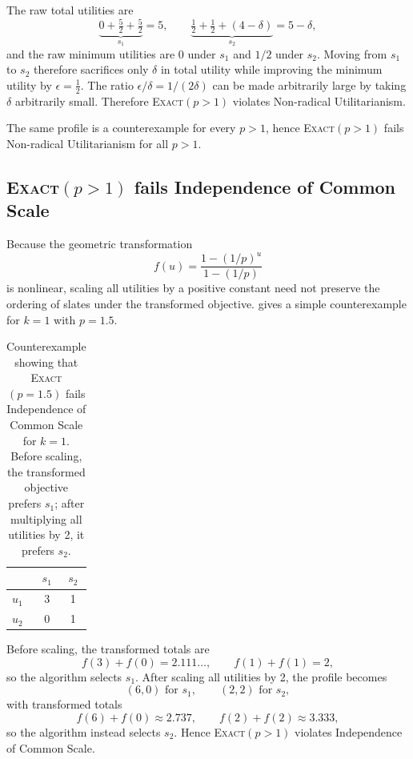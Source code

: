 \documentclass[11pt]{article}
\newcommand{\ExactP}{\textsc{Exact}$(p>1)$}
\begin{document}
The raw total utilities are
\[
\underbrace{0+\tfrac52+\tfrac52}_{s_1}=5,\qquad
\underbrace{\tfrac12+\tfrac12+(4-\delta)}_{s_2}=5-\delta,
\]
and the raw minimum utilities are \(0\) under \(s_1\) and \(1/2\) under \(s_2\).
Moving from \(s_1\) to \(s_2\) therefore sacrifices only \(\delta\)
in total utility while improving the minimum utility by
\( \epsilon=\tfrac12 .\)
The ratio \(\epsilon/\delta = 1/(2\delta)\)
can be made arbitrarily large by taking \(\delta\) arbitrarily small. Therefore
\ExactP{} violates Non-radical Utilitarianism.

The same profile is a counterexample for every \(p>1\), hence \ExactP{} fails Non-radical Utilitarianism for all \(p>1\).

\subsection{\ExactP{} fails Independence of Common Scale}

Because the geometric transformation
\[
f(u)=\frac{1-(1/p)^u}{1-(1/p)}
\]
is nonlinear, scaling all utilities by a positive constant need not preserve the ordering of slates under the transformed objective.  gives a simple counterexample for \(k=1\) with \(p=1.5\).

\begin{table}[t]
\centering
\begin{tabular}{lcc}
\hline
 & $s_1$ & $s_2$ \\
\hline
$u_1$ & 3 & 1 \\
$u_2$ & 0 & 1 \\
\hline
\end{tabular}
\caption{Counterexample showing that \textsc{Exact}$(p=1.5)$ fails Independence of Common Scale for \(k=1\). Before scaling, the transformed objective prefers \(s_1\); after multiplying all utilities by 2, it prefers \(s_2\).}
\label{tab:failure-exact-scale}
\end{table}

Before scaling, the transformed totals are
\[
f(3)+f(0)=2.111\ldots, \qquad f(1)+f(1)=2,
\]
so the algorithm selects \(s_1\). After scaling all utilities by 2, the profile becomes
\[
(6,0)\text{ for } s_1, \qquad (2,2)\text{ for } s_2,
\]
with transformed totals
\[
f(6)+f(0)\approx 2.737, \qquad f(2)+f(2)\approx 3.333,
\]
so the algorithm instead selects \(s_2\). Hence \ExactP{} violates Independence of Common Scale.
\end{document}
